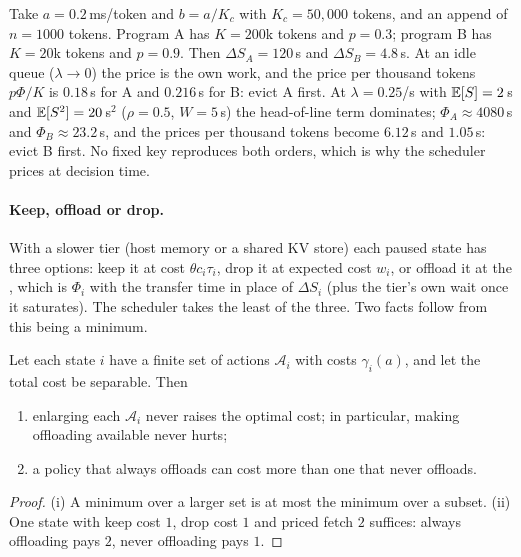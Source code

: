 \begin{example}\label{L5:ex:flip}
Take $a=0.2$\,ms/token and $b=a/K_c$ with $K_c=50{,}000$ tokens, and an
append of $n=1000$ tokens. Program A has $K=200$k tokens and $p=0.3$;
program B has $K=20$k tokens and $p=0.9$. Then $\Delta S_A=120$\,s and
$\Delta S_B=4.8$\,s. At an idle queue ($\lambda\to0$) the price is the own
work, and the price per thousand tokens $p\Phi/K$ is $0.18$\,s for A and
$0.216$\,s for B: evict A first. At $\lambda=0.25$/s with $\mathbb{E}[S]=2$\,s and
$\mathbb{E}[S^2]=20$\,s$^2$ ($\rho=0.5$, $W=5$\,s) the head-of-line term dominates;
$\Phi_A\approx4080$\,s and $\Phi_B\approx23.2$\,s, and the prices per
thousand tokens become $6.12$\,s and $1.05$\,s: evict B first. No fixed key
reproduces both orders, which is why the scheduler prices at decision time.
\end{example}

\paragraph{Keep, offload or drop.} With a slower tier (host memory or a
shared KV store) each paused state has three options: keep it at cost
$\theta c_i\tau_i$, drop it at expected cost $w_i$, or offload it at the
, which is $\Phi_i$ with the transfer time in place of
$\Delta S_i$ (plus the tier's own wait once it saturates). The scheduler
takes the least of the three. Two facts follow from this being a minimum.

\begin{proposition}\label{L5:prop:offload}
Let each state $i$ have a finite set of actions $\mathcal{A}_i$ with
costs $\gamma_i(a)$, and let the total cost be separable. Then
\begin{enumerate}[label=(\roman*)]
\item enlarging each $\mathcal{A}_i$ never raises the optimal cost; in
  particular, making offloading available never hurts;
\item a policy that always offloads can cost more than one that never
  offloads.
\end{enumerate}
\end{proposition}

\begin{proof}
(i) A minimum over a larger set is at most the minimum over a subset.
(ii) One state with keep cost $1$, drop cost $1$ and priced fetch $2$
suffices: always offloading pays $2$, never offloading pays $1$.
\end{proof}

